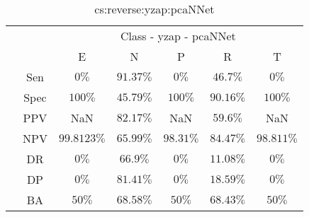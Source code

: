 \begin{table}[!ht]
	\centering
	\begin{tabular}{|c|c|c|c|c|c|c|}
		\cline{3-7}
		\multicolumn{2}{c|}{} & \multicolumn{5}{c|}{Class - yzap - pcaNNet} \\ \cline{3-7}
		\multicolumn{2}{c|}{} & E & N & P & R & T \\ \hline
		\multirow{7}{*}{\rotatebox{90}{Statistics}} & Sen & $0\%$ & $91.37\%$ & $0\%$ & $46.7\%$ & $0\%$ \\ \cline{2-7}
		 & Spec & $100\%$ & $45.79\%$ & $100\%$ & $90.16\%$ & $100\%$ \\ \cline{2-7}
		 & PPV & NaN & $82.17\%$ & NaN & $59.6\%$ & NaN \\ \cline{2-7}
		 & NPV & $99.8123\%$ & $65.99\%$ & $98.31\%$ & $84.47\%$ & $98.811\%$ \\ \cline{2-7}
		 & DR & $0\%$ & $66.9\%$ & $0\%$ & $11.08\%$ & $0\%$ \\ \cline{2-7}
		 & DP & $0\%$ & $81.41\%$ & $0\%$ & $18.59\%$ & $0\%$ \\ \cline{2-7}
		 & BA & $50\%$ & $68.58\%$ & $50\%$ & $68.43\%$ & $50\%$ \\ \hline
	\end{tabular}
	\caption{cs:reverse:yzap:pcaNNet}
	\label{tab:cs:reverse:yzap:pcaNNet}
\end{table}
